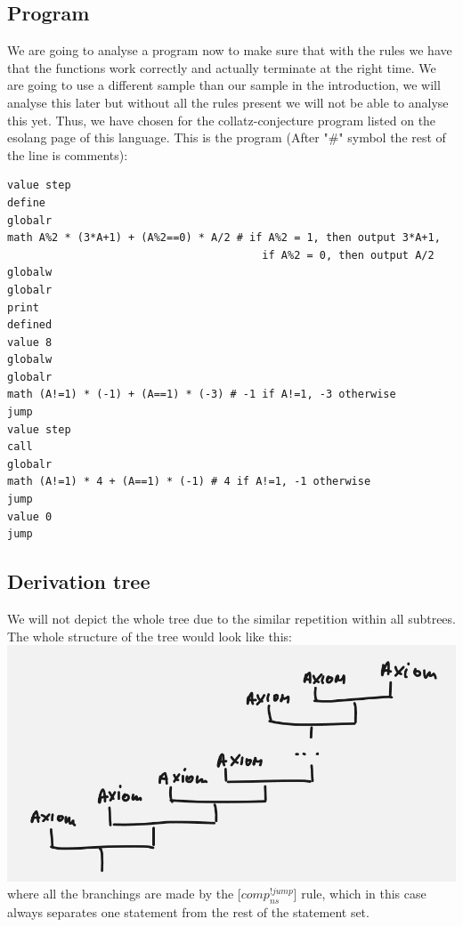\documentclass{article}
\begin{document}
\subsection{Program}
We are going to analyse a program now to make sure that with the rules we have that the functions work correctly and actually terminate at the right time. We are going to use a different sample than our sample in the introduction, we will analyse this later but without all the rules present we will not be able to analyse this yet. Thus, we have chosen for the collatz-conjecture program listed on the esolang page of this language. This is the program (After "\#" symbol the rest of the line is comments):\\
\begin{verbatim}
value step
define
globalr
math A%2 * (3*A+1) + (A%2==0) * A/2 # if A%2 = 1, then output 3*A+1, 
                                        if A%2 = 0, then output A/2
globalw
globalr
print
defined
value 8 
globalw
globalr
math (A!=1) * (-1) + (A==1) * (-3) # -1 if A!=1, -3 otherwise
jump
value step
call
globalr
math (A!=1) * 4 + (A==1) * (-1) # 4 if A!=1, -1 otherwise
jump
value 0
jump
\end{verbatim}

\subsection{Derivation tree}

We will not depict the whole tree due to the similar repetition within all subtrees. The whole structure of the tree would look like this:\\

\includegraphics[scale=0.5]{treelook.png}\\
where all the branchings are made by the [$comp_{ns}^{!jump}$] rule, which in this case always separates one statement from the rest of the statement set.\\
\end{document}
